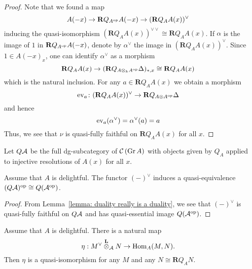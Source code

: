 \begin{proof}
  Note that we found a map
  \begin{displaymath}
    A(-x) \to \mathbf{R}Q_{A^{\operatorname{op}}} A(-x) \to ( \mathbf{R}Q_A A(x) )^\vee 
  \end{displaymath}
  inducing the quasi-isomorphism \((\mathbf{R}Q_A A(x))^{\vee \vee} \cong \mathbf{R}Q_A A(x)\).
  If \(\alpha\) is the image of \(1\) in \(\mathbf{R}Q_{A^{\operatorname{op}}} A(-x)\), denote by \(\alpha^\vee\) the image in \((\mathbf{R}Q_A A(x))^\vee\).
  Since \(1 \in A(-x)_x\), one can identify \(\alpha^\vee\) as a morphism
  \[\mathbf{R}Q_A A(x) \to (\mathbf{R}Q_{A \otimes_k A^{\operatorname{op}}} \Delta)_{\ast,x} \cong \mathbf{R}Q_A A(x)\]
  which is the natural inclusion.
  For any \(a \in \mathbf{R}Q_A A(x)\) we obtain a morphism
  \[\operatorname{ev}_a \colon (\mathbf{R}Q_A A(x))^\vee \to \mathbf{R}Q_{A \otimes A^{\operatorname{op}}} \Delta \]
  and hence
  \[\operatorname{ev}_a(\alpha^\vee) = \alpha^\vee(a) = a\]
  Thus, we see that \(\nu\) is quasi-fully faithful on \(\mathbf{R}Q_A A(x)\) for all \(x\). 
\end{proof}

\begin{definition}
  Let \(Q\mathcal{A}\) be the full dg-subcategory of \(\mathcal{C}\left(\operatorname{Gr}A\right)\) with objects given by \(Q_A\) applied to injective resolutions of \(A(x)\) for all \(x\). 
\end{definition}

\begin{corollary} \label{corollary: duality is a duality}
  Assume that \(A\) is delightful. The functor \((-)^\vee\) induces a quasi-equivalence \((Q\mathcal{A})^{\operatorname{op}} \cong Q(\mathcal{A}^{\operatorname{op}})\). 
\end{corollary}

\begin{proof}
  From Lemma~\ref{lemma: duality really is a duality}, we see that \((-)^\vee\) is quasi-fully faithful on \(Q\mathcal{A}\) and has quasi-essential image \(Q(\mathcal{A}^{\operatorname{op}})\). 
\end{proof}

\begin{lemma} \label{lemma: trace map}
  Assume that \(A\) is delightful. There is a natural map 
  \begin{displaymath}
    \eta : M^\vee \overset{\mathbf{L}}{\otimes}_{\mathcal A} N \to \operatorname{Hom}_A(M,N).
  \end{displaymath}
  Then \(\eta\) is a quasi-isomorphism for any \(M\) and any \(N \cong \mathbf{R}Q_A N\). 
\end{lemma}

